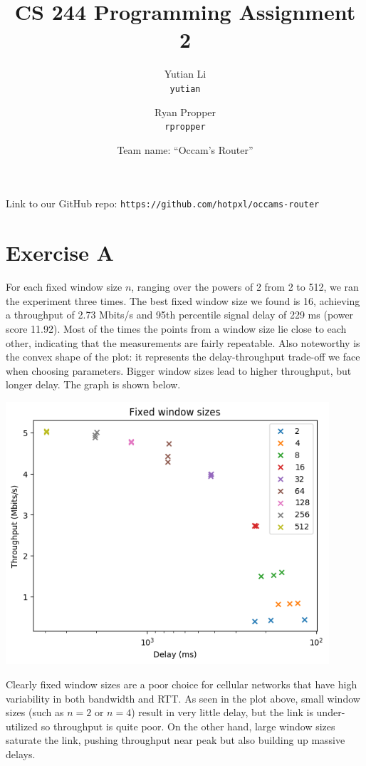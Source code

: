\documentclass{article}
\title{CS 244 Programming Assignment 2}
\author{Yutian Li\\ \texttt{yutian} \and Ryan Propper\\ \texttt{rpropper}}
\date{Team name: ``Occam's Router''}
\begin{document}
\maketitle

Link to our GitHub repo:  \texttt{https://github.com/hotpxl/occams-router}

\section*{Exercise A}

For each fixed window size $n$, ranging over the powers of 2 from 2 to 512, we ran the experiment three times. The best fixed window size we found is 16, achieving a throughput of 2.73 Mbits/s and 95th percentile signal delay of 229 ms (power score 11.92). Most of the times the points from a window size lie close to each other, indicating that the measurements are fairly repeatable. Also noteworthy is the convex shape of the plot: it represents the delay-throughput trade-off we face when choosing parameters. Bigger window sizes lead to higher throughput, but longer delay. The graph is shown below.

\begin{center}
\includegraphics[width=0.9\textwidth]{images/exercise_a.png}
\end{center}

Clearly fixed window sizes are a poor choice for cellular networks that have high variability in both bandwidth and RTT. As seen in the plot above, small window sizes (such as $n = 2$ or $n = 4$) result in very little delay, but the link is under-utilized so throughput is quite poor. On the other hand, large window sizes saturate the link, pushing throughput near peak but also building up massive delays.
\end{document}
